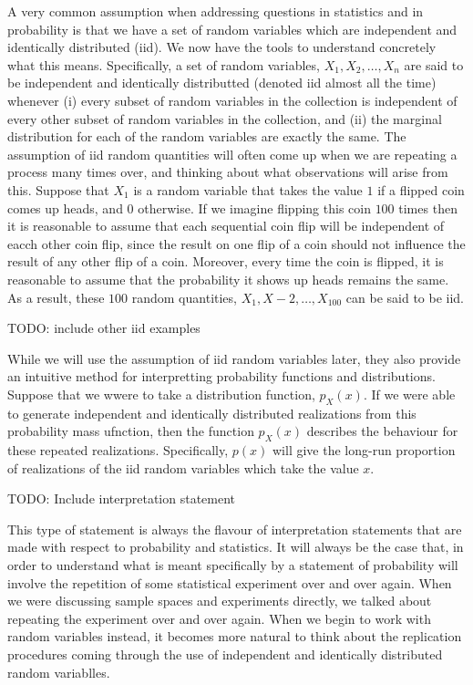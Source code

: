 \documentclass[
  letterpaper,
  DIV=11,
  numbers=noendperiod]{scrreprt}
\begin{document}
A very common assumption when addressing questions in statistics and in
probability is that we have a set of random variables which are
independent and identically distributed (iid). We now have the tools to
understand concretely what this means. Specifically, a set of random
variables, \(X_1,X_2,\dots,X_n\) are said to be independent and
identically distributted (denoted iid almost all the time) whenever (i)
every subset of random variables in the collection is independent of
every other subset of random variables in the collection, and (ii) the
marginal distribution for each of the random variables are exactly the
same. The assumption of iid random quantities will often come up when we
are repeating a process many times over, and thinking about what
observations will arise from this. Suppose that \(X_1\) is a random
variable that takes the value \(1\) if a flipped coin comes up heads,
and \(0\) otherwise. If we imagine flipping this coin \(100\) times then
it is reasonable to assume that each sequential coin flip will be
independent of eacch other coin flip, since the result on one flip of a
coin should not influence the result of any other flip of a coin.
Moreover, every time the coin is flipped, it is reasonable to assume
that the probability it shows up heads remains the same. As a result,
these \(100\) random quantities, \(X_1,  X-2,  \dots,  X_{100}\) can be
said to be iid.

TODO: include other iid examples

While we will use the assumption of iid random variables later, they
also provide an intuitive method for interpretting probability functions
and distributions. Suppose that we wwere to take a distribution
function, \(p_X(x)\). If we were able to generate independent and
identically distributed realizations from this probability mass
ufnction, then the function \(p_X(x)\) describes the behaviour for these
repeated realizations. Specifically, \(p(x)\) will give the long-run
proportion of realizations of the iid random variables which take the
value \(x\).

TODO: Include interpretation statement

This type of statement is always the flavour of interpretation
statements that are made with respect to probability and statistics. It
will always be the case that, in order to understand what is meant
specifically by a statement of probability will involve the repetition
of some statistical experiment over and over again. When we were
discussing sample spaces and experiments directly, we talked about
repeating the experiment over and over again. When we begin to work with
random variables instead, it becomes more natural to think about the
replication procedures coming through the use of independent and
identically distributed random variablles.
\end{document}
